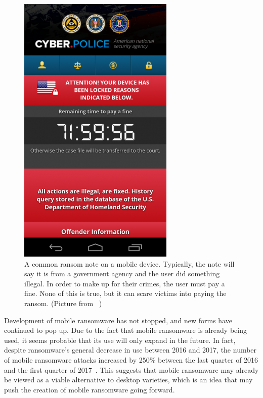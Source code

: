 \documentclass{IEEEtran}
\begin{document}
\begin{figure}[h]
\begin{center}
\includegraphics[scale = 0.4]{mobileransomware.png}
\end{center}
  \caption{A common ransom note on a mobile device. Typically, the note will say it is from a government agency and the user did something illegal. In order to make up for their crimes, the user must pay a fine. None of this is true, but it can scare victims into paying the ransom.
  (Picture from ~\cite{RN18})}
  \label{fig:mr}
\end{figure}

Development of mobile ransomware has not stopped, and new forms have continued to pop up. Due to the fact that mobile ransomware is already being used, it seems probable that its use will only expand in the future. In fact, despite ransomware's general decrease in use between 2016 and 2017, the number of mobile ransomware attacks increased by 250\% between the last quarter of 2016 and the first quarter of 2017~\cite{RN12}. This suggests that mobile ransomware may already be viewed as a viable alternative to desktop varieties, which is an idea that may push the creation of mobile ransomware going forward.
\hfill \break
\end{document}
